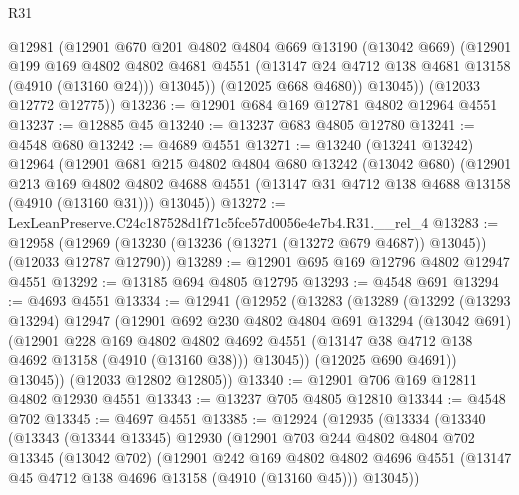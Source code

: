 \begin{lexlean}{R31}
\begin{coremodule}
            @12981
            (@12901
              @670
              @201
              @4802
              @4804
              @669
              @13190
              (@13042 @669)
              (@12901
                @199
                @169
                @4802
                @4802
                @4681
                @4551
                (@13147 @24 @4712 @138 @4681 @13158 (@4910 (@13160 @24)))
                @13045))
            (@12025 @668 @4680))
          @13045))
      (@12033 @12772 @12775))
@13236 := @12901 @684 @169 @12781 @4802 @12964 @4551
@13237 := @12885 @45
@13240 := @13237 @683 @4805 @12780
@13241 := @4548 @680
@13242 := @4689 @4551
@13271 := @13240
    (@13241 @13242)
    @12964
    (@12901
      @681
      @215
      @4802
      @4804
      @680
      @13242
      (@13042 @680)
      (@12901
        @213
        @169
        @4802
        @4802
        @4688
        @4551
        (@13147 @31 @4712 @138 @4688 @13158 (@4910 (@13160 @31)))
        @13045))
@13272 := LexLeanPreserve.C24c187528d1f71c5fce57d0056e4e7b4.R31.__rel_4
@13283 := @12958
    (@12969 (@13230 (@13236 (@13271 (@13272 @679 @4687)) @13045)) (@12033 @12787 @12790))
@13289 := @12901 @695 @169 @12796 @4802 @12947 @4551
@13292 := @13185 @694 @4805 @12795
@13293 := @4548 @691
@13294 := @4693 @4551
@13334 := @12941
    (@12952
      (@13283
        (@13289
          (@13292
            (@13293 @13294)
            @12947
            (@12901
              @692
              @230
              @4802
              @4804
              @691
              @13294
              (@13042 @691)
              (@12901
                @228
                @169
                @4802
                @4802
                @4692
                @4551
                (@13147 @38 @4712 @138 @4692 @13158 (@4910 (@13160 @38)))
                @13045))
            (@12025 @690 @4691))
          @13045))
      (@12033 @12802 @12805))
@13340 := @12901 @706 @169 @12811 @4802 @12930 @4551
@13343 := @13237 @705 @4805 @12810
@13344 := @4548 @702
@13345 := @4697 @4551
@13385 := @12924
    (@12935
      (@13334
        (@13340
          (@13343
            (@13344 @13345)
            @12930
            (@12901
              @703
              @244
              @4802
              @4804
              @702
              @13345
              (@13042 @702)
              (@12901
                @242
                @169
                @4802
                @4802
                @4696
                @4551
                (@13147 @45 @4712 @138 @4696 @13158 (@4910 (@13160 @45)))
                @13045))

\end{coremodule}
\end{lexlean}
